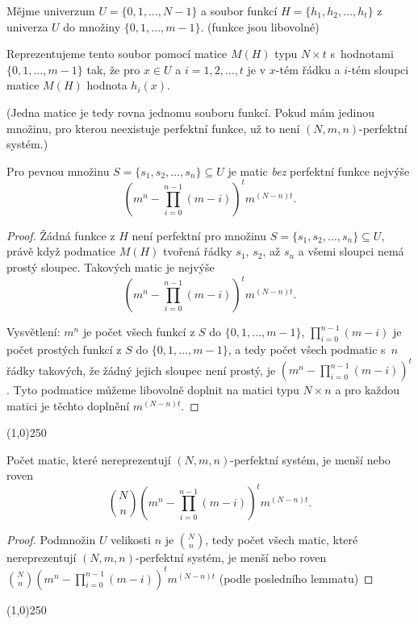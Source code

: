 \documentclass[a4paper,12pt]{article}
\newenvironment{myproof}{
  \begin{proof}
    
  }{
  \end{proof}
  \begin{center}
   \line(1,0){250}
   \end{center}
  }
\begin{document}
Mějme univerzum $U=\{0,1,\dots,N-1\}$ a soubor 
funkcí $H=\{h_1,h_2,\dots,h_t\}$ z univerza $U$ do množiny 
$\{0,1,\dots,m-1\}$. (funkce jsou libovolné)

\begin{definice}
    Reprezentujeme tento soubor pomocí 
matice $M(H)$ typu $N\times t$ s~hodnotami $\{0,1,\dots,m-1\}$ tak, 
že pro $x\in U$ a $i=1,2,\dots,t$ je 
v $x$-tém řádku a $i$-tém sloupci matice $M(H)$ 
hodnota $h_i(x)$.
\end{definice}

(Jedna matice je tedy rovna jednomu souboru funkcí. Pokud mám jedinou množinu, pro kterou neexistuje perfektní funkce, už to není $(N,m,n)$-perfektní systém.)

\begin{lemma}
    Pro pevnou množinu $S=\{s_1,s_2,\dots,s_n\}\subseteq U$ je matic \emph{bez} perfektní funkce nejvýše $$(m^n-\prod_{i=0}^{n-1}(m-i))^tm^{(N-n)t}.$$
\end{lemma}

\begin{myproof}
    Žádná funkce z $H$ 
    není perfektní pro množinu $S=\{s_1,s_2,\dots,s_n\}\subseteq 
    U$, 
    právě když podmatice $M(H)$ tvoře\-ná 
    řádky $s_1$, $s_2$, až $s_n$ a všemi sloupci nemá prostý sloupec. 
    Ta\-ko\-vých matic je nejvýše 
    $$(m^n-\prod_{i=0}^{n-1}(m-i))^tm^{(N-n)t}.$$ 
    
    Vysvětlení:  $m^n$ je počet všech funkcí z $
    S$ do 
    $\{0,1,\dots,m-1\}$, $\prod_{i=0}^{n-1}(m-i)$ je počet prostých funkcí z $
    S$ 
    do $\{0,1,\dots,m-1\}$, a tedy počet všech podmatic s~$n$ 
    řádky takových, že žádný jejich sloupec není prostý, je 
    $(m^n-\prod_{i=0}^{n-1}(m-i))^t$.  Tyto podmatice můžeme 
    libovolně doplnit na matici typu $N\times n$ a pro každou 
    matici je těchto doplnění $m^{(N-n)t}$.
\end{myproof}

\begin{lemma}
    Počet matic, které nereprezentují $(N,m,n)$-perfektní systém, je 
    menší nebo roven  
    $$\binom Nn(m^n-\prod_{i=0}^{n-1}(m-i))^tm^{(N-n)t}.$$
\end{lemma}

\begin{myproof}
Podmnožin $U$ velikosti $n$ je $\binom Nn$, tedy počet všech 
matic, které nereprezentují $(N,m,n)$-perfektní systém, je 
menší nebo roven  
$\binom Nn(m^n-\prod_{i=0}^{n-1}(m-i))^tm^{(N-n)t}$ (podle posledního lemmatu)
\end{myproof}
\end{document}
